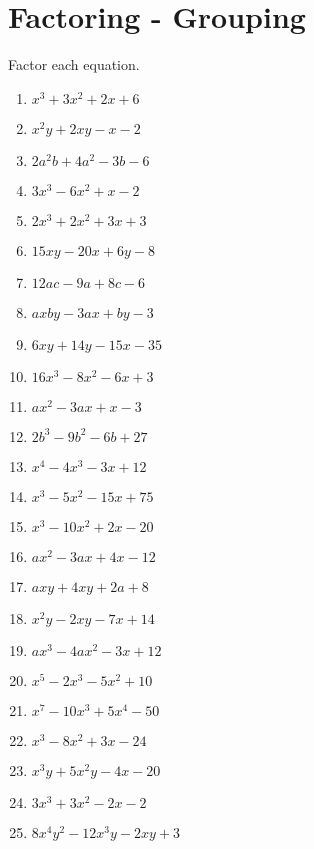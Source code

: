 \documentclass{article}
\begin{document}
\newpage
\section{Factoring - Grouping}
Factor each equation. \\
\begin{enumerate}
\item $x^{3} + 3x^{2} + 2x + 6$
\item $x^{2}y + 2xy - x - 2$
\item $2a^{2}b + 4a^{2} - 3b - 6$
\item $3x^{3} - 6x^{2} + x - 2$
\item $2x^{3} + 2x^{2} + 3x + 3$
\item $15xy - 20x + 6y - 8$
\item $12ac - 9a + 8c - 6$
\item $axby - 3ax + by - 3$
\item $6xy + 14y - 15x - 35$
\item $16x^{3} - 8x^{2} - 6x + 3$
\item $ax^{2} - 3ax + x - 3$
\item $2b^{3} - 9b^{2} - 6b + 27$
\item $x^{4} - 4x^{3} - 3x + 12$
\item $x^{3} - 5x^{2} - 15x + 75$
\item $x^{3} - 10x^{2} + 2x - 20$
\item $ax^{2} - 3ax + 4x - 12$
\item $axy + 4xy + 2a + 8$
\item $x^{2}y - 2xy - 7x + 14$
\item $ax^{3} - 4ax^{2} - 3x + 12$
\item $x^{5} - 2x^{3} - 5x^{2} + 10$
\item $x^{7} - 10x^{3} + 5x^{4} - 50$
\item $x^{3} - 8x^{2} + 3x - 24$
\item $x^{3}y + 5x^{2}y - 4x - 20$
\item $3x^{3} + 3x^{2} - 2x - 2$
\item $8x^{4}y^{2} - 12x^{3}y - 2xy + 3$
\end{enumerate}
\end{document}
